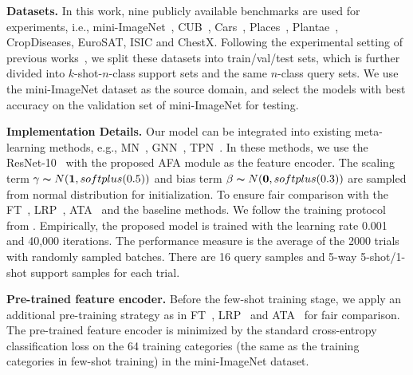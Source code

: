 \documentclass[runningheads]{utils/llncs}
\begin{document}
 
\textbf{Datasets.}
In this work, nine publicly available benchmarks are used for experiments, i.e., mini-ImageNet~\cite{NIPS2016_90e13578}, CUB~\cite{welinder2010caltech}, Cars~\cite{Krause0DF13}, Places~\cite{zhou2017places}, Plantae~\cite{HornASCSSAPB18}, CropDiseases, EuroSAT, ISIC and ChestX. 
Following the experimental setting of previous works~\cite{TsengLH020,WangD21}, we split these datasets into train/val/test sets, which is further divided into ${k}$-shot-${n}$-class support sets and the same ${n}$-class query sets.
We use the mini-ImageNet dataset as the source domain, and select the models with best accuracy on the validation set of mini-ImageNet for testing.

\noindent
{\bf Implementation Details.}
Our model can be integrated into existing meta-learning methods, e.g., MN~\cite{NIPS2016_90e13578}, GNN~\cite{SatorrasE18}, TPN~\cite{LiuLPKYHY19}.
In these methods, we use the ResNet-10~\cite{HeZRS16} with the proposed AFA module as the feature encoder.
The scaling term $\gamma \thicksim N(\textbf{1}, softplus(0.5))$ and bias term $\beta \thicksim N(\textbf{0}, softplus(0.3))$ are sampled from normal distribution for initialization.
To ensure fair comparison with the FT~\cite{TsengLH020}, LRP~\cite{SunLSZCB20}, ATA~\cite{WangD21} and the baseline methods. 
We follow the training protocol from \cite{ChenLKWH19}.
Empirically, the proposed model is trained with the learning rate 0.001 and 40,000 iterations. 
The performance measure is the average of the 2000 trials with randomly sampled batches. 
There are 16 query samples and 5-way 5-shot/1-shot support samples for each trial. 

\noindent
{\bf Pre-trained feature encoder.} Before the few-shot training stage, we apply an additional pre-training strategy as in FT~\cite{TsengLH020}, LRP~\cite{SunLSZCB20} and ATA~\cite{WangD21} for fair comparison.
The pre-trained feature encoder is minimized by the standard cross-entropy classification loss on the 64 training categories (the same as the training categories in few-shot training) in the mini-ImageNet dataset.
\end{document}
